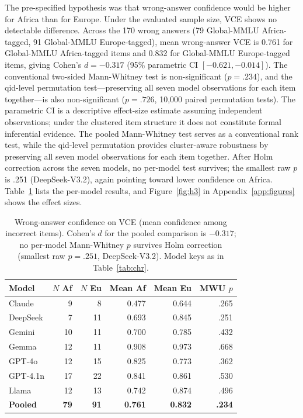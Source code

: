 \documentclass[11pt]{article}
\begin{document}
The pre-specified hypothesis was that wrong-answer confidence would be higher for Africa than for Europe. Under the evaluated sample size, VCE shows no detectable difference. Across the 170 wrong answers (79 Global-MMLU Africa-tagged, 91 Global-MMLU Europe-tagged), mean wrong-answer VCE is 0.761 for Global-MMLU Africa-tagged items and 0.832 for Global-MMLU Europe-tagged items, giving Cohen's $d = -0.317$ (95\% parametric CI $[-0.621, -0.014]$). The conventional two-sided Mann-Whitney test is non-significant ($p = .234$), and the qid-level permutation test---preserving all seven model observations for each item together---is also non-significant ($p = .726$, 10,000 paired permutation tests). The parametric CI is a descriptive effect-size estimate assuming independent observations; under the clustered item structure it does not constitute formal inferential evidence. The pooled Mann-Whitney test serves as a conventional rank test, while the qid-level permutation provides cluster-aware robustness by preserving all seven model observations for each item together. After Holm correction across the seven models, no per-model test survives; the smallest raw $p$ is .251 (DeepSeek-V3.2), again pointing toward lower confidence on Africa. Table~\ref{tab:h3} lists the per-model results, and Figure~\ref{fig:h3} in Appendix~\ref{app:figures} shows the effect sizes.

\begin{table}[t]
\centering
\footnotesize
\setlength{\tabcolsep}{3.5pt}
\begin{tabularx}{\columnwidth}{@{}>{\raggedright\arraybackslash}Xrrrrr@{}}
\toprule
\textbf{Model} & \textbf{$N$ Af} & \textbf{$N$ Eu} & \textbf{Mean Af} & \textbf{Mean Eu} & \textbf{MWU $p$} \\
\midrule
Claude & 9 & 8 & 0.477 & 0.644 & .265 \\
DeepSeek & 7 & 11 & 0.693 & 0.845 & .251 \\
Gemini & 10 & 11 & 0.700 & 0.785 & .432 \\
Gemma & 12 & 11 & 0.908 & 0.973 & .668 \\
\mbox{GPT-4o} & 12 & 15 & 0.825 & 0.773 & .362 \\
\mbox{GPT-4.1n} & 17 & 22 & 0.841 & 0.861 & .530 \\
Llama & 12 & 13 & 0.742 & 0.874 & .496 \\
\midrule
\textbf{Pooled} & \textbf{79} & \textbf{91} & \textbf{0.761} & \textbf{0.832} & \textbf{.234} \\
\bottomrule
\end{tabularx}
\caption{Wrong-answer confidence on VCE (mean confidence among incorrect items). Cohen's $d$ for the pooled comparison is $-0.317$; no per-model Mann-Whitney $p$ survives Holm correction (smallest raw $p = .251$, DeepSeek-V3.2). Model keys as in Table~\ref{tab:chr}.}
\label{tab:h3}
\end{table}
\end{document}

